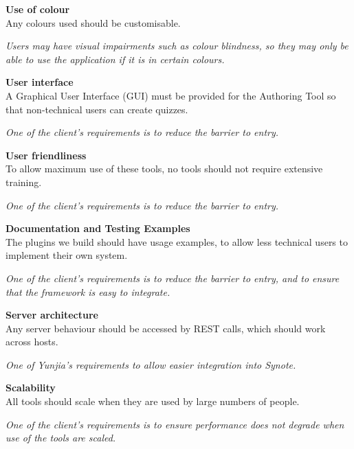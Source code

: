 \begin{requirement}[label=\textbf{N\arabic*}]
	\item \textbf{Use of colour}\label{Req:Use of colour} \hfill \\ 
		Any colours used should be customisable.

		\textit{Users may have visual impairments such as colour blindness, so they may only be able to use the application if it is in certain colours.}

	\item \textbf{User interface} \label{Req:User interface} \hfill \\ 
		A Graphical User Interface (GUI) must be provided for the Authoring Tool so that non-technical users can create quizzes.

		\textit{One of the client's requirements is to reduce the barrier to entry.}

	\item \textbf{User friendliness} \label{Req:User friendliness} \hfill \\ 
		To allow maximum use of these tools, no tools should not require extensive training.

		\textit{One of the client's requirements is to reduce the barrier to entry.}

	\item \textbf{Documentation and Testing Examples} \label{Req:Documentation} \hfill \\ 
		The plugins we build should have usage examples, to allow less technical users to implement their own system.

		\textit{One of the client's requirements is to reduce the barrier to entry, and to ensure that the framework is easy to integrate.}

	\item \textbf{Server architecture} \label{Req:Server architecture} \hfill \\ 
		Any server behaviour should be accessed by \gls{REST} calls, which should work across hosts.

		\textit{One of Yunjia's requirements to allow easier integration into Synote.}

	\item \textbf{Scalability} \label{Req:Scalability} \hfill \\ 
		All tools should scale when they are used by large numbers of people.

		\textit{One of the client's requirements is to ensure performance does not degrade when use of the tools are scaled.}
\end{requirement}

